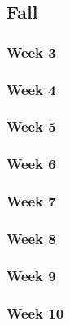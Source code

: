 \documentclass[../final.tex]{subfiles}
\begin{document}
\subsection{Fall}
\subsubsection{Week 3}
\subsubsection{Week 4}
\subsubsection{Week 5}
\subsubsection{Week 6}
\subsubsection{Week 7}
\subsubsection{Week 8}
\subsubsection{Week 9}
\subsubsection{Week 10}
\end{document}

